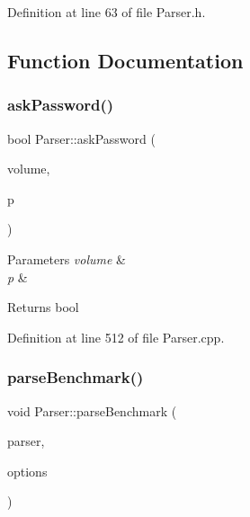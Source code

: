 Definition at line 63 of file Parser.\+h.



\subsection{Function Documentation}
\mbox{\label{namespace_parser_adf13e015ae2b7536868c427360401238}} 
\subsubsection{\texorpdfstring{ask\+Password()}{askPassword()}}
{\footnotesize\ttfamily bool Parser\+::ask\+Password (\begin{DoxyParamCaption}\item[{std\+::string}]{volume,  }\item[{Q\+String \&}]{p }\end{DoxyParamCaption})}


\begin{DoxyParams}{Parameters}
{\em volume} & \\
\hline
{\em p} & \\
\hline
\end{DoxyParams}
\begin{DoxyReturn}{Returns}
bool 
\end{DoxyReturn}


Definition at line 512 of file Parser.\+cpp.

\mbox{\label{namespace_parser_a8aeeeb21b1d6f07cfe0c69c5b3a9e4a1}} 
\subsubsection{\texorpdfstring{parse\+Benchmark()}{parseBenchmark()}}
{\footnotesize\ttfamily void Parser\+::parse\+Benchmark (\begin{DoxyParamCaption}\item[{Q\+Command\+Line\+Parser \&}]{parser,  }\item[{Q\+Shared\+Pointer$<$ \hyperlink{struct_gost_crypt_1_1_core_1_1_benchmark_algorithms_request}{Gost\+Crypt\+::\+Core\+::\+Benchmark\+Algorithms\+Request} $>$}]{options }\end{DoxyParamCaption})}


